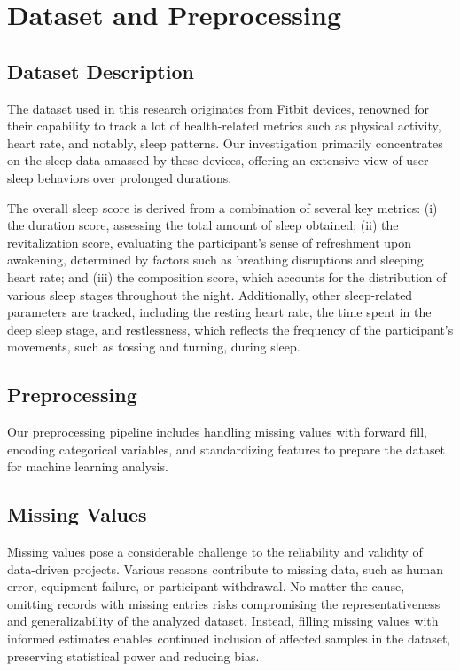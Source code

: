\documentclass[10pt]{extarticle}
\begin{document}
\section{Dataset and Preprocessing}

\subsection{Dataset Description}

The dataset used in this research originates from Fitbit devices, renowned for their capability to track a lot of health-related metrics such as physical activity, heart rate, and notably, sleep patterns. Our investigation primarily concentrates on the sleep data amassed by these devices, offering an extensive view of user sleep behaviors over prolonged durations.

The overall sleep score is derived from a combination of several key metrics: (i) the duration score, assessing the total amount of sleep obtained; (ii) the revitalization score, evaluating the participant's sense of refreshment upon awakening, determined by factors such as breathing disruptions and sleeping heart rate; and (iii) the composition score, which accounts for the distribution of various sleep stages throughout the night. Additionally, other sleep-related parameters are tracked, including the resting heart rate, the time spent in the deep sleep stage, and restlessness, which reflects the frequency of the participant's movements, such as tossing and turning, during sleep.

\subsection{Preprocessing}

Our preprocessing pipeline includes handling missing values with forward fill, encoding categorical variables, and standardizing features to prepare the dataset for machine learning analysis.

\subsection{Missing Values}

Missing values pose a considerable challenge to the reliability and validity of data-driven projects. Various reasons contribute to missing data, such as human error, equipment failure, or participant withdrawal. No matter the cause, omitting records with missing entries risks compromising the representativeness and generalizability of the analyzed dataset. Instead, filling missing values with informed estimates enables continued inclusion of affected samples in the dataset, preserving statistical power and reducing bias.
\end{document}
